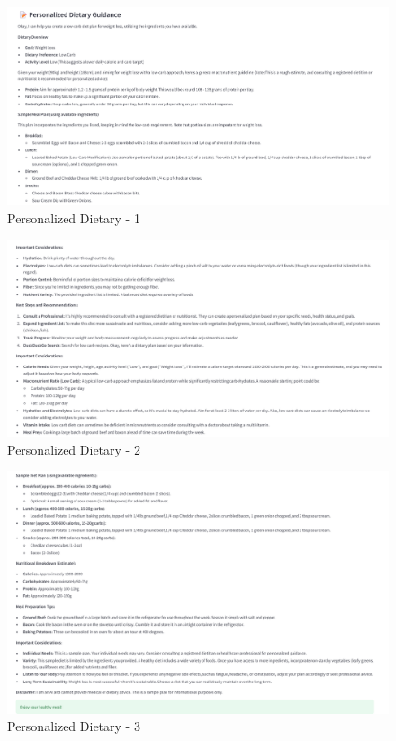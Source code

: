 \documentclass[letterpaper,11pt]{report}
\begin{document}
\begin{figure}[h]
    \centering
    \includegraphics[width=\linewidth]{Personaliesed Dietry - 1.png}
    \caption{Personalized Dietary - 1}
    \label{fig:Thought Process}
\end{figure}
\newpage
\begin{figure}[h]
    \centering
    \includegraphics[width=\linewidth]{Dietry Part -2.png}
    \caption{Personalized Dietary - 2}
    \label{fig:Thought Process}
\end{figure}
\newpage
\begin{figure}[h]
    \centering
    \includegraphics[width=\linewidth]{Dietry Part - 3.png}
    \caption{Personalized Dietary - 3}
    \label{fig:Thought Process}
\end{figure}
\end{document}
